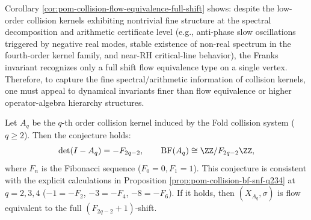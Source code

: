 \begin{remark}\label{rem:pom-collision-flow-collapse}
Corollary \ref{cor:pom-collision-flow-equivalence-full-shift} shows: despite the low-order collision kernels exhibiting nontrivial fine structure at the spectral decomposition and arithmetic certificate level (e.g., anti-phase slow oscillations triggered by negative real modes, stable existence of non-real spectrum in the fourth-order kernel family, and near-RH critical-line behavior), the Franks invariant recognizes only a full shift flow equivalence type on a single vertex.
Therefore, to capture the fine spectral/arithmetic information of collision kernels, one must appeal to dynamical invariants finer than flow equivalence or higher operator-algebra hierarchy structures.
\end{remark}

\begin{conjecture}\label{conj:pom-collision-fibonacci-twist}
Let \(A_q\) be the \(q\)-th order collision kernel induced by the Fold collision system (\(q\ge 2\)).
Then the conjecture holds:
\[
\det(I-A_q)=-F_{2q-2},
\qquad
\mathrm{BF}(A_q)\cong \ZZ/F_{2q-2}\ZZ,
\]
where \(F_n\) is the Fibonacci sequence (\(F_0=0,F_1=1\)).
This conjecture is consistent with the explicit calculations in Proposition \ref{prop:pom-collision-bf-snf-q234} at \(q=2,3,4\) (\(-1=-F_2\), \(-3=-F_4\), \(-8=-F_6\)).
If it holds, then \((X_{A_q},\sigma)\) is flow equivalent to the full \((F_{2q-2}+1)\)-shift.
\end{conjecture}

